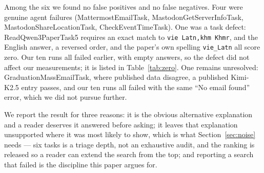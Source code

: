 Among the six we found no false positives and no false negatives. Four were
genuine agent failures (MattermostEmailTask, MastodonGetServerInfoTask,
MastodonShareLocationTask, CheckEventTimeTask). One was a task defect:
ReadQwen3PaperTask5 requires an exact match to \texttt{vie Latn,khm Khmr}, and
the English answer, a reversed order, and the paper's own spelling
\texttt{vie\_Latn} all score zero. Our ten runs all failed earlier, with empty
answers, so the defect did not affect our measurements; it is listed in
Table~\ref{tab:zero}. One remains unresolved: GraduationMassEmailTask, where
published data disagree, a published Kimi-K2.5 entry passes, and our ten runs
all failed with the same ``No email found'' error, which we did not pursue
further.

We report the result for three reasons: it is the obvious alternative
explanation and a reader deserves it answered before asking; it leaves that
explanation unsupported where it was most likely to show, which is what
Section~\ref{sec:noise} needs --- six tasks is a triage depth, not an
exhaustive audit, and the ranking is released so a reader can extend the search
from the top; and reporting a search that failed is the discipline this paper
argues for.
